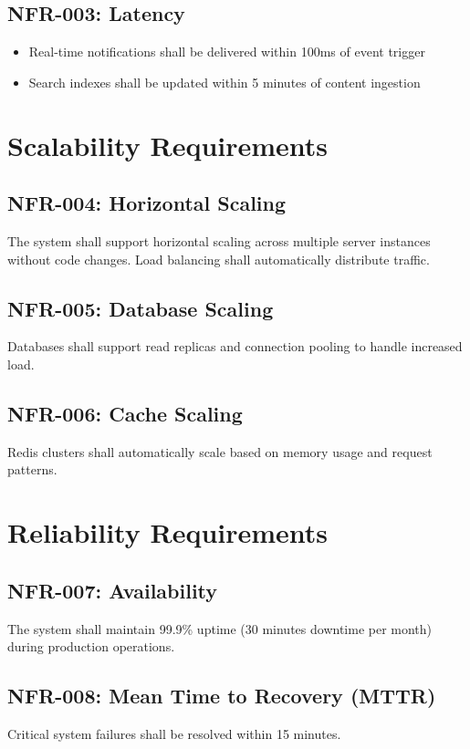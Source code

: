 \documentclass{report}
\begin{document}
\subsection{NFR-003: Latency}
\begin{itemize}
    \item Real-time notifications shall be delivered within 100ms of event trigger
    \item Search indexes shall be updated within 5 minutes of content ingestion
\end{itemize}

\section{Scalability Requirements}

\subsection{NFR-004: Horizontal Scaling}
The system shall support horizontal scaling across multiple server instances without code changes. Load balancing shall automatically distribute traffic.

\subsection{NFR-005: Database Scaling}
Databases shall support read replicas and connection pooling to handle increased load.

\subsection{NFR-006: Cache Scaling}
Redis clusters shall automatically scale based on memory usage and request patterns.

\section{Reliability Requirements}

\subsection{NFR-007: Availability}
The system shall maintain 99.9\% uptime (30 minutes downtime per month) during production operations.

\subsection{NFR-008: Mean Time to Recovery (MTTR)}
Critical system failures shall be resolved within 15 minutes.
\end{document}
